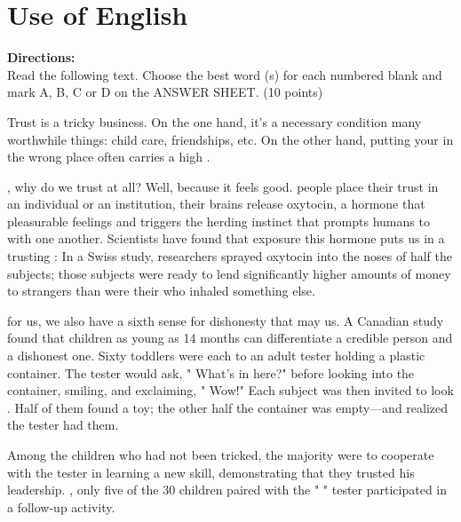 




\section{Use of English}

\noindent
\textbf{Directions:}\\
Read the following text. Choose the best word (s) for each numbered blank
and mark A, B, C or D on the ANSWER SHEET. (10 points)



\TiGanSpace

Trust is a tricky business. On the one hand, it's a necessary
condition \cloze many worthwhile things: child care, friendships,
etc. On the other hand, putting your \cloze in the wrong place
often carries a high \cloze.

\cloze , why do we trust at all? Well, because it feels good.
\cloze people place their trust in an individual or an
institution, their brains release oxytocin, a hormone that \cloze
pleasurable feelings and triggers the herding instinct that prompts
humans to \cloze with one another. Scientists have found that
exposure \cloze this hormone puts us in a trusting \cloze
: In a Swiss study, researchers sprayed oxytocin into the noses of half
the subjects; those subjects were ready to lend significantly higher
amounts of money to strangers than were their \cloze who inhaled
something else.

\cloze for us, we also have a sixth sense for dishonesty that
may \cloze us. A Canadian study found that children as young as
14 months can differentiate \cloze a credible person and a
dishonest one. Sixty toddlers were each \cloze to an adult
tester holding a plastic container. The tester would ask, " What's in
here?" before looking into the container, smiling, and exclaiming,
" Wow!" Each subject was then invited to look \cloze. Half of
them found a toy; the other half \cloze the container was
empty---and realized the tester had \cloze them.

Among the children who had not been tricked, the majority were
\cloze to cooperate with the tester in learning a new skill,
demonstrating that they trusted his leadership. \cloze , only
five of the 30 children paired with the " \cloze " tester
participated in a follow-up activity.



\newpage

